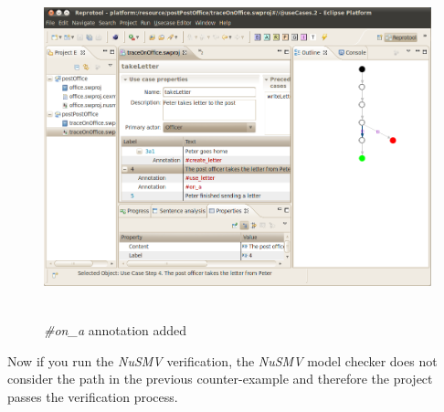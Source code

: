 \begin{figure}[ht]
  \centering
  \includegraphics[height=280pt]{images/reprotoolOnA}
  \caption{\emph{\#on\_a} annotation added}
  \label{fig:reprotoolOnA}
\end{figure}

Now if you run the \emph{NuSMV} verification, the \emph{NuSMV} model checker does not consider the path in the previous counter-example
and therefore the project passes the verification process. 
